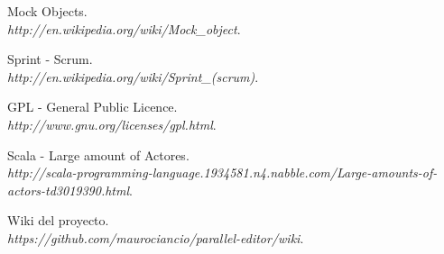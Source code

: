 \documentclass[12pt,a4paper]{article}
\begin{document}
\begin{thebibliography}{9}
	Mock Objects. \\
	\textsl{http://en.wikipedia.org/wiki/Mock\_object}.
	
	Sprint - Scrum. \\
	\textsl{http://en.wikipedia.org/wiki/Sprint\_(scrum)}.
	
	GPL - General Public Licence. \\
	\textsl{http://www.gnu.org/licenses/gpl.html}.
	
	Scala - Large amount of Actores. \\
	\textsl{http://scala-programming-language.1934581.n4.nabble.com/Large-amounts-of-actors-td3019390.html}.
	
	Wiki del proyecto. \\
	\textsl{https://github.com/maurociancio/parallel-editor/wiki}.

\end{thebibliography}
\end{document}
